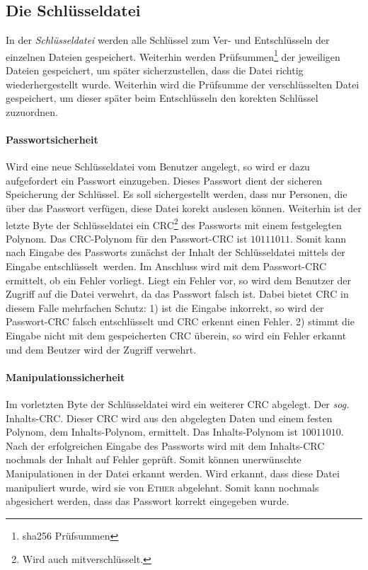 \documentclass[a4paper,11pt]{article}
\begin{document}
\subsection*{Die Schlüsseldatei}
In der \textit{Schlüsseldatei} werden alle Schlüssel zum Ver- und Entschlüsseln der einzelnen Dateien gespeichert. Weiterhin werden Prüfsummen\footnote{sha256 Prüfsummen}
der jeweiligen Dateien gespeichert, um später sicherzustellen, dass die Datei richtig wiederhergestellt wurde. Weiterhin wird die Prüfsumme der
verschlüsselten Datei gespeichert, um dieser später beim Entschlüsseln den korekten Schlüssel zuzuordnen.

\paragraph{Passwortsicherheit} Wird eine neue Schlüsseldatei vom Benutzer angelegt, so wird er dazu aufgefordert ein Passwort einzugeben. Dieses Passwort
dient der sicheren Speicherung der Schlüssel. Es soll sichergestellt werden, dass nur Personen, die über das Passwort verfügen, diese Datei korekt auslesen können.
Weiterhin ist der letzte Byte der Schlüsseldatei ein CRC\footnote{Wird auch mitverschlüsselt.} des Passworts mit einem festgelegten Polynom. Das CRC-Polynom für 
den Passwort-CRC ist $10111011$. Somit kann nach Eingabe des Passworts zunächst der Inhalt der Schlüsseldatei mittels der Eingabe \glqq entschlüsselt\grqq\ werden. Im Anschluss
wird mit dem Passwort-CRC ermittelt, ob ein Fehler vorliegt. Liegt ein Fehler vor, so wird dem Benutzer der Zugriff auf die Datei verwehrt, da das Passwort falsch ist. Dabei
bietet CRC in diesem Falle mehrfachen Schutz: 1) ist die Eingabe inkorrekt, so wird der Passwort-CRC falsch entschlüsselt und CRC erkennt einen Fehler. 2) stimmt die Eingabe nicht
mit dem gespeicherten CRC überein, so wird ein Fehler erkannt und dem Beutzer wird der Zugriff verwehrt.

\paragraph{Manipulationssicherheit} Im vorletzten Byte der Schlüsseldatei wird ein weiterer CRC abgelegt. Der \textit{sog.} Inhalts-CRC. Dieser CRC wird
aus den abgelegten Daten und einem festen Polynom, dem Inhalts-Polynom, ermittelt. Das Inhalts-Polynom ist $10011010$. Nach der erfolgreichen Eingabe des Passworts wird
mit dem Inhalts-CRC nochmals der Inhalt auf Fehler geprüft. Somit können unerwünschte Manipulationen in der Datei erkannt werden. Wird erkannt, dass
diese Datei manipuliert wurde, wird sie von \textsc{Ether} abgelehnt. Somit kann nochmals abgesichert werden, dass das Passwort korrekt eingegeben wurde.
\end{document}
